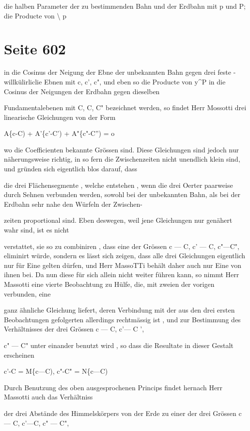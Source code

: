 \documentclass[10pt,a4paper]{article}
\begin{document}
die halben Parameter der zu bestimmenden Bahn und der Erdbahn mit p und P; die Producte von \textbackslash{} p


\newpage
\section*{Seite 602}
in die Cosinus der Neigung der Ebne der unbekannten Bahn gegen drei feste -willkülirliclie Ebnen mit c, c', c", und eben so die Producte von y\textasciicircum{}P in die Cosinus der Neigungen der Erdbahn gegen dieselben

Fundamentalebenen mit C, C, C" bezeichnet werden, so findet Herr Mossotti drei linearische Gleichungen von der Form

A\{c-C) + A'\{c'-C') + A"\{c"-C'') = o

wo die Coefficienten bekannte Grössen sind. Diese Gleichungen sind jedoch nur näherungsweise richtig, in so fern die Zwischenzeiten nicht unendlich klein sind, und gründen sich eigentlich blos darauf, dass

die drei Flächensegmente , welche entstehen , wenn die drei Oerter paarweise durch Sehnen verbunden werden, sowohl bei der unbekannten Bahn, als bei der Erdbahn sehr nahe den Würfeln der Zwischen-

zeiten proportional sind. Eben deswegen, weil jene Gleichungen nur genähert wahr sind, ist es nicht

verstattet, sie so zu combiniren , dass eine der Grössen c — C, c' — C, c"—C", eliminirt würde, sondern es lässt sich zeigen, dass alle drei Gleichungen eigentlich nur für Eine gelten dürfen, und Herr MassoTTi behält daher auch nur Eine von ihnen bei. Da nun diese für sich allein nicht weiter führen kann, so nimmt Herr Massotti eine vierte Beobachtung zu Hülfe, die, mit zweien der vorigen verbunden, eine

ganz ähnliche Gleichung liefert, deren Verbindung mit der aus den drei ersten Beobachtungen gefolgerten allerdings rechtmässig ist , und zur Bestimmung des Verhältnisses der drei Grössen c — C, c'— C ',

c" — C" unter einander benutzt wird , so dass die Resultate in dieser Gestalt erscheinen

c'-C = M\{c—C), c"-C" = N\{c—C)

Durch Benutzung des oben ausgesprochenen Princips findet hernach Herr Massotti auch das Verhältniss

der drei Abstände des Himmelskörpers von der Erde zu einer der drei Grössen c— C, c'—C, c" — C",
\end{document}
